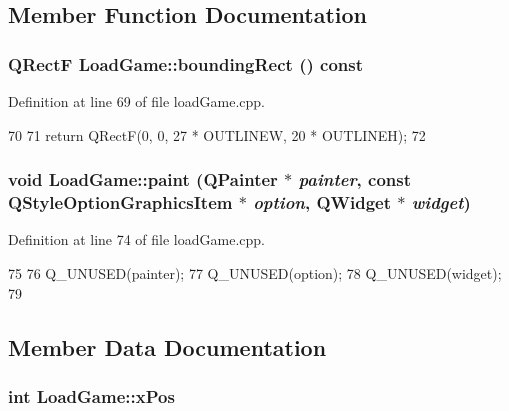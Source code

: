\subsection{Member Function Documentation}
\hypertarget{class_load_game_a0bea88d2a8f433f8f632b60bec679191}{
\subsubsection[{boundingRect}]{\setlength{\rightskip}{0pt plus 5cm}QRectF LoadGame::boundingRect () const}}
\label{class_load_game_a0bea88d2a8f433f8f632b60bec679191}


Definition at line 69 of file loadGame.cpp.


\begin{DoxyCode}
70 {
71     return QRectF(0, 0, 27 * OUTLINEW, 20 * OUTLINEH);
72 }
\end{DoxyCode}
\hypertarget{class_load_game_a5a33efb42771cf6a0dfacaab5c2e64a8}{
\subsubsection[{paint}]{\setlength{\rightskip}{0pt plus 5cm}void LoadGame::paint (QPainter $\ast$ {\em painter}, \/  const QStyleOptionGraphicsItem $\ast$ {\em option}, \/  QWidget $\ast$ {\em widget})}}
\label{class_load_game_a5a33efb42771cf6a0dfacaab5c2e64a8}


Definition at line 74 of file loadGame.cpp.


\begin{DoxyCode}
75 {
76     Q_UNUSED(painter);
77     Q_UNUSED(option);
78     Q_UNUSED(widget);
79 }
\end{DoxyCode}


\subsection{Member Data Documentation}
\hypertarget{class_load_game_ada8b1081dcfe3ce73dcf7f02bc9eb824}{
\subsubsection[{xPos}]{\setlength{\rightskip}{0pt plus 5cm}int {\bf LoadGame::xPos}}}
\label{class_load_game_ada8b1081dcfe3ce73dcf7f02bc9eb824}


